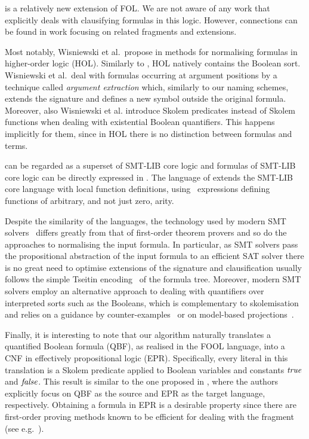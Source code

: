 \folb{} is a relatively new extension of FOL. We are not aware of any work that explicitly deals with clausifying formulas in this logic. However, connections can be found in work focusing on related fragments and extensions.

Most notably, Wisniewski et al.~propose in %
\cite{DBLP:conf/cade/WisniewskiSKB16}
methods for normalising formulas in higher-order logic (HOL). Similarly to \folb{},
HOL natively contains the Boolean sort. Wisniewski et al.~deal with 
formulas occurring at argument positions by a technique called \emph{argument extraction} 
which, similarly to our naming schemes, extends the signature and defines a new symbol
outside the original formula. Moreover, also Wisniewski et al. introduce Skolem predicates 
instead of Skolem functions when dealing with existential Boolean quantifiers. 
This happens implicitly for them, since in HOL there is no distinction between formulas and terms.

\folb{} can be regarded as a superset of SMT-LIB \cite{BarFT-SMTLIB} core logic and formulas of SMT-LIB core logic can be directly expressed in \folb{}. The language of \folb{} extends the SMT-LIB core language with local function definitions, using \LETIN\ expressions defining functions of arbitrary, and not just zero, arity. 

Despite the similarity of the languages, the technology used by modern SMT solvers~\cite{DBLP:journals/jacm/NieuwenhuisOT06}
differs greatly from that of %
first-order theorem provers and so do the approaches to normalising the input formula.
In particular, as SMT solvers pass the propositional abstraction of the input formula to an efficient SAT solver
there is no great need to optimise extensions of the signature 
and clausification usually follows the simple Tseitin encoding~\cite{tseitin_enc} of the formula tree.
%
Moreover, modern SMT solvers employ an alternative approach to dealing with quantifiers over interpreted sorts such as the Booleans, 
which is complementary to skolemisation
and relies on a guidance by counter-examples~\cite{DBLP:journals/corr/Reynolds0K15} or on model-based projections~\cite{LPAR-20:Playing_with_Quantified_Satisfaction}.

Finally, it is interesting to note that our \nfcnf{} algorithm naturally translates a quantified Boolean formula (QBF),
as realised in the FOOL language, into a CNF in effectively propositional logic (EPR).
Specifically, every literal in this translation is 
a Skolem predicate applied to Boolean variables and constants $\mathit{true}$ and $\mathit{false}$.
This result is similar to the one proposed in \cite{DBLP:conf/cade/SeidlLB12},
where the authors explicitly focus on QBF as the source and EPR as the target language, respectively.
Obtaining a formula in EPR is a desirable property %
since there are first-order proving methods 
known to be efficient for dealing with the fragment (see e.g.~\cite{DBLP:conf/birthday/Korovin13}).